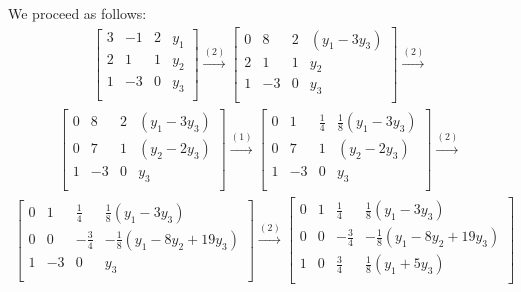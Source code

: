 \documentclass[12pt]{article}
\begin{document}
\begin{enumerate}
    We proceed as follows:
    \begin{align*}
      \begin{bmatrix}
        3 & -1 & 2 & y_1\\
        2 & 1  & 1 & y_2\\
        1 & -3 & 0 & y_3\\
      \end{bmatrix}
      \xrightarrow{(2)}
      \begin{bmatrix}
        0 & 8  & 2 & (y_1 - 3y_3)\\
        2 & 1  & 1 & y_2\\
        1 & -3 & 0 & y_3\\
      \end{bmatrix}
      \xrightarrow{(2)}
    \end{align*}
    \begin{align*}
      \begin{bmatrix}
        0 & 8  & 2 & (y_1 - 3y_3)\\
        0 & 7  & 1 & (y_2 - 2y_3)\\
        1 & -3 & 0 & y_3\\
      \end{bmatrix}
      \xrightarrow{(1)}
      \begin{bmatrix}
        0 & 1  & \frac{1}{4} & \frac{1}{8}(y_1 - 3y_3)\\
        0 & 7  & 1           & (y_2 - 2y_3)\\
        1 & -3 & 0           & y_3\\
      \end{bmatrix}
      \xrightarrow{(2)}
    \end{align*}
    \begin{align*}
      \begin{bmatrix}
        0 & 1  & \frac{1}{4}  & \frac{1}{8}(y_1 - 3y_3)\\
        0 & 0  & -\frac{3}{4} & -\frac{1}{8}(y_1 - 8y_2 + 19y_3)\\
        1 & -3 & 0            & y_3\\
      \end{bmatrix}
      \xrightarrow{(2)}
      \begin{bmatrix}
        0 & 1 & \frac{1}{4}  & \frac{1}{8}(y_1 - 3y_3)\\
        0 & 0 & -\frac{3}{4} & -\frac{1}{8}(y_1 - 8y_2 + 19y_3)\\
        1 & 0 & \frac{3}{4}  & \frac{1}{8}(y_1 + 5y_3)\\
      \end{bmatrix}

\end{align*}
\end{enumerate}
\end{document}
